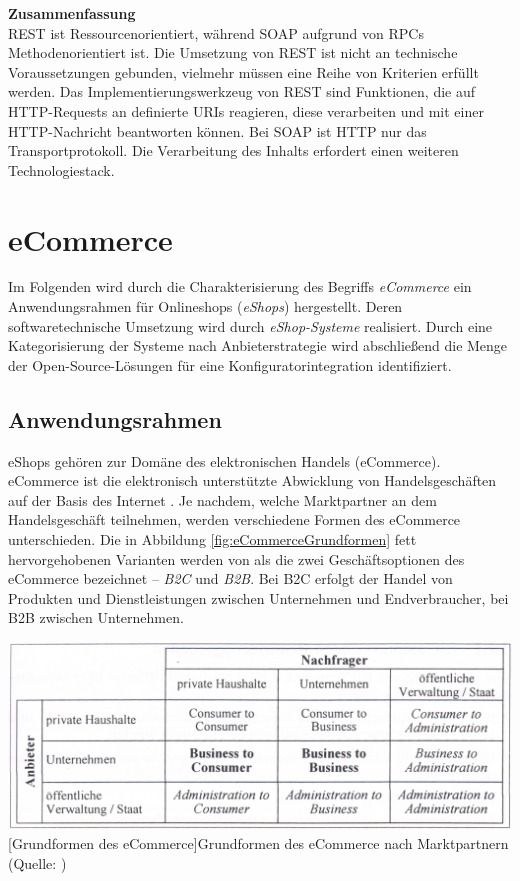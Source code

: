 \documentclass[11pt, a4paper, titlepage, listof=totoc, bibliography=totoc, index=totoc, twoside, openright, headings=normal, draft]{scrreprt}
\begin{document}
\textbf{Zusammenfassung}\\
REST ist Ressourcenorientiert, während SOAP aufgrund von \ac{RPC}s Methodenorientiert ist. Die Umsetzung von REST ist nicht an technische Voraussetzungen gebunden, vielmehr müssen eine Reihe von Kriterien erfüllt werden. Das Implementierungswerkzeug von REST sind Funktionen, die auf HTTP-Requests an definierte URIs reagieren, diese verarbeiten und mit einer HTTP-Nachricht beantworten können. Bei SOAP ist HTTP nur das Transportprotokoll. Die Verarbeitung des Inhalts erfordert einen weiteren Technologiestack.

\section{eCommerce}
\label{eCommerce}

Im Folgenden wird durch die Charakterisierung des Begriffs \emph{eCommerce} ein Anwendungsrahmen für Onlineshops (\emph{eShops}) hergestellt. Deren softwaretechnische Umsetzung wird durch \emph{eShop-Systeme} realisiert. Durch eine Kategorisierung der Systeme nach Anbieterstrategie wird abschließend die Menge der Open-Source-Lösungen für eine Konfiguratorintegration identifiziert.

\subsection{Anwendungsrahmen}
\label{eCommerce:Anwendungsrahmen}
eShops gehören zur Domäne des elektronischen Handels (eCommerce). eCommerce ist \glqq die elektronisch unterstützte Abwicklung von Handelsgeschäften auf der Basis des Internet\grqq{} \citep{schwarze02}. Je nachdem, welche Marktpartner an dem Handelsgeschäft teilnehmen, werden verschiedene Formen des eCommerce unterschieden. Die in Abbildung \ref{fig:eCommerceGrundformen} fett hervorgehobenen Varianten werden von \citet{meier12} als \glqq die zwei Geschäftsoptionen des eCommerce\grqq{} bezeichnet -- \emph{\ac{B2C}} und \emph{\ac{B2B}}. Bei \ac{B2C} erfolgt der Handel von Produkten und Dienstleistungen zwischen Unternehmen und Endverbraucher, bei \ac{B2B} zwischen Unternehmen.

\vspace{1em}
\begin{minipage}{\linewidth}
	\centering
	\includegraphics[width=0.7\linewidth]{Abbildungen/eCommerceGrundformen.png}
	[Grundformen des eCommerce]{Grundformen des eCommerce nach Marktpartnern (Quelle: \citet{schwarze02})}
	\label{fig:eCommerceGrundformen}
\end{minipage}
\vspace{0.1em}
\end{document}
